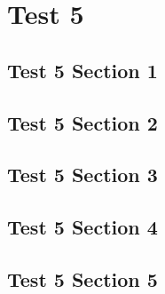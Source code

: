 \chapter{Test 5}
\localtableofcontents
\clearpage

\section{Test 5 Section 1}

\linebreak

\section{Test 5 Section 2}

\linebreak

\section{Test 5 Section 3}

\linebreak

\section{Test 5 Section 4}

\linebreak

\section{Test 5 Section 5}

\linebreak